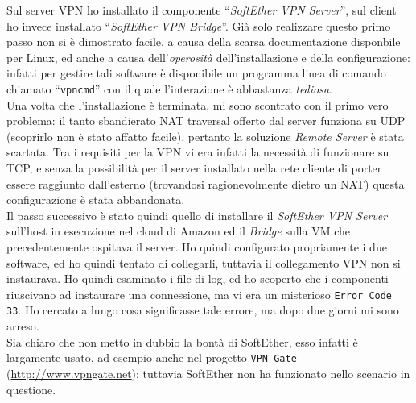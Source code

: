 Sul server VPN ho installato il componente ``\textit{SoftEther VPN Server}'', sul client ho
invece installato ``\textit{SoftEther VPN Bridge}''. Già solo realizzare questo primo passo
non si è dimostrato facile, a causa della scarsa documentazione disponbile per Linux,
ed anche a causa dell'\textit{operosità} dell'installazione e della configurazione:
infatti per gestire tali software è disponibile un programma linea di comando chiamato
``\texttt{vpncmd}'' con il quale l'interazione è abbastanza \textit{tediosa}.\\
Una volta che l'installazione è terminata, mi sono scontrato con il primo vero problema:
il tanto sbandierato NAT traversal offerto dal server funziona su UDP (scoprirlo non
è stato affatto facile), pertanto la soluzione \textit{Remote Server} è stata scartata.
Tra i requisiti per la VPN vi era infatti la necessità di funzionare su TCP, e senza
la possibilità per il server installato nella rete cliente di porter essere raggiunto
dall'esterno (trovandosi ragionevolmente dietro un NAT) questa configurazione è stata
abbandonata.\\
Il passo successivo è stato quindi quello di installare il \textit{SoftEther VPN Server}
sull'host in esecuzione nel cloud di Amazon ed il \textit{Bridge} sulla VM che precedentemente
ospitava il server. Ho quindi configurato propriamente i due software, ed ho quindi
tentato di collegarli, tuttavia il collegamento VPN non si instaurava. Ho quindi
esaminato i file di log, ed ho scoperto che i componenti riuscivano ad instaurare
una connessione, ma vi era un misterioso \texttt{Error Code 33}. Ho cercato a lungo
cosa significasse tale errore, ma dopo due giorni mi sono arreso.\\

Sia chiaro che non metto in dubbio la bontà di SoftEther, esso infatti è largamente usato,
ad esempio anche nel progetto \texttt{VPN Gate} (\url{http://www.vpngate.net}); tuttavia
SoftEther non ha funzionato nello scenario in questione.
